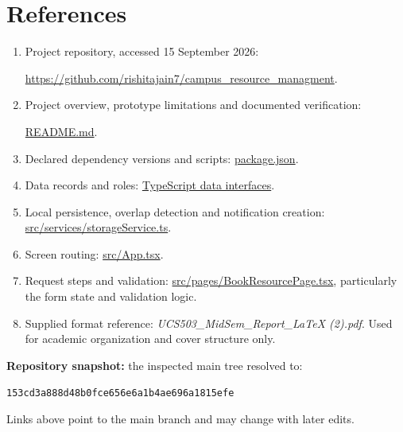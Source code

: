 \documentclass[11pt,a4paper]{report}
\newcommand{\src}[1]{\nolinkurl{#1}}
\begin{document}
\chapter*{References}
\begin{enumerate}
\item Project repository, accessed 15 September 2026:\par\url{https://github.com/rishitajain7/campus_resource_managment}.
\item Project overview, prototype limitations and documented verification:\par\href{https://github.com/rishitajain7/campus_resource_managment/blob/main/README.md}{README.md}.
\item Declared dependency versions and scripts: \href{https://github.com/rishitajain7/campus_resource_managment/blob/main/package.json}{package.json}.
\item Data records and roles: \href{https://github.com/rishitajain7/campus_resource_managment/blob/main/src/types/index.ts}{TypeScript data interfaces}.
\item Local persistence, overlap detection and notification creation: \href{https://github.com/rishitajain7/campus_resource_managment/blob/main/src/services/storageService.ts}{src/services/storageService.ts}.
\item Screen routing: \href{https://github.com/rishitajain7/campus_resource_managment/blob/main/src/App.tsx}{src/App.tsx}.
\item Request steps and validation: \href{https://github.com/rishitajain7/campus_resource_managment/blob/main/src/pages/BookResourcePage.tsx}{src/pages/BookResourcePage.tsx}, particularly the form state and validation logic.
\item Supplied format reference: \textit{UCS503\_MidSem\_Report\_LaTeX (2).pdf}. Used for academic organization and cover structure only.
\end{enumerate}
\textbf{Repository snapshot:} the inspected main tree resolved to:\par
{\small\src{153cd3a888d48b0fce656e6a1b4ae696a1815efe}}\par
Links above point to the main branch and may change with later edits.
\end{document}
